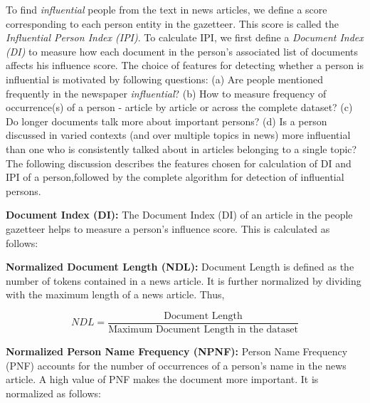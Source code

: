 To find \emph{influential} people from the text in news articles, we define a score corresponding to each person entity in the gazetteer. This score is called the \emph{Influential Person Index (IPI)}. To calculate IPI, we first define a \emph{Document Index (DI)} to measure how each document in the person's associated list of documents affects his influence score. The choice of features for detecting whether a person is influential is motivated by following questions: (a) Are people mentioned frequently in the newspaper \emph{influential}? (b) How to measure frequency of occurrence(s) of a person - article by article or across the complete dataset? (c) Do longer documents talk more about important persons? (d) Is a person discussed in varied contexts (and over multiple topics in news) more influential than one who is consistently talked about in articles belonging to a single topic?  The following discussion describes the features chosen for calculation of DI and IPI of a person,followed by the complete algorithm for detection of influential persons.

\noindent \textbf{Document Index (DI): }
The Document Index (DI) of an article in the people gazetteer helps to measure a person's influence score. This is calculated as follows:

\noindent \textbf{Normalized Document Length (NDL): } 
Document Length is defined as the number of tokens contained in a news article. It is further normalized by dividing with the maximum length of a news article. Thus,  

$$NDL=\dfrac{\text{Document Length}} {\text{Maximum Document Length in the dataset}}$$



\noindent \textbf{ Normalized Person Name Frequency (NPNF): }
Person Name Frequency (PNF) accounts for the number of occurrences of a person's name in the news article. A high value of PNF makes the document more important. It is normalized as follows:

